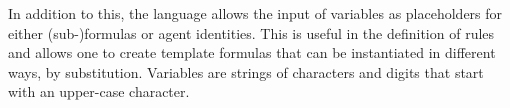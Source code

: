 In addition to this, the language allows the input of variables as
placeholders for either (sub-)formulas or agent identities. This is useful in
the definition of rules and allows one to create template formulas that can
be instantiated in different ways, by substitution.
Variables are strings of characters and digits that start with an upper-case
character.
